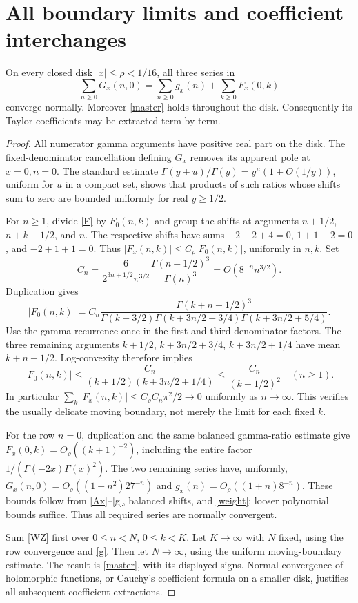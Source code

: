 \documentclass[11pt,a4paper]{article}
\begin{document}
\section{All boundary limits and coefficient interchanges}
\begin{lemma}\label{normal}
On every closed disk $|x|\le\rho<1/16$, all three series in
\begin{equation}\label{master}
 \sum_{n\ge0}G_x(n,0)=\sum_{n\ge0}g_x(n)+\sum_{k\ge0}F_x(0,k)
\end{equation}
converge normally. Moreover \eqref{master} holds throughout the disk.
Consequently its Taylor coefficients may be extracted term by term.
\end{lemma}
\begin{proof}
All numerator gamma arguments have positive real part on the disk.
The fixed-denominator cancellation defining $G_x$ removes its apparent
pole at $x=0,n=0$. The standard estimate
$\Gamma(y+u)/\Gamma(y)=y^u(1+O(1/y))$, uniform for $u$ in a compact set,
shows that products of such ratios whose shifts sum to zero are bounded
uniformly for real $y\ge1/2$.

For $n\ge1$, divide \eqref{F} by $F_0(n,k)$ and group the shifts at
arguments $n+1/2$, $n+k+1/2$, and $n$. The respective shifts have sums
$-2-2+4=0$, $1+1-2=0$, and $-2+1+1=0$.
Thus $|F_x(n,k)|\le C_\rho|F_0(n,k)|$, uniformly in $n,k$.
Set
\[
 C_n=\frac6{2^{3n+1/2}\pi^{3/2}}
       \frac{\Gamma(n+1/2)^3}{\Gamma(n)^3}=O(8^{-n}n^{3/2}).
\]
Duplication gives
\[
 |F_0(n,k)|=C_n
 \frac{\Gamma(k+n+1/2)^3}
 {\Gamma(k+3/2)\Gamma(k+3n/2+3/4)\Gamma(k+3n/2+5/4)}.
\]
Use the gamma recurrence once in the first and third denominator factors.
The three remaining arguments
$k+1/2$, $k+3n/2+3/4$, $k+3n/2+1/4$ have mean $k+n+1/2$.
Log-convexity therefore implies
\[
 |F_0(n,k)|\le\frac{C_n}{(k+1/2)(k+3n/2+1/4)}
 \le\frac{C_n}{(k+1/2)^2}\quad(n\ge1).
\]
In particular $\sum_k|F_x(n,k)|\le C_\rho C_n\pi^2/2\to0$
uniformly as $n\to\infty$. This verifies the usually delicate moving
boundary, not merely the limit for each fixed $k$.

For the row $n=0$, duplication and the same balanced gamma-ratio estimate
give $F_x(0,k)=O_\rho((k+1)^{-2})$, including the entire factor
$1/(\Gamma(-2x)\Gamma(x)^2)$. The two remaining series have, uniformly,
$G_x(n,0)=O_\rho((1+n^2)27^{-n})$ and
$g_x(n)=O_\rho((1+n)8^{-n})$. These bounds follow from \eqref{Ax}--\eqref{g},
balanced shifts, and \eqref{weight}; looser polynomial bounds suffice.
Thus all required series are normally convergent.

Sum \eqref{WZ} first over $0\le n<N$, $0\le k<K$. Let $K\to\infty$
with $N$ fixed, using the row convergence and \eqref{g}. Then let
$N\to\infty$, using the uniform moving-boundary estimate. The result is
\eqref{master}, with its displayed signs. Normal convergence of
holomorphic functions, or Cauchy's coefficient formula on a smaller disk,
justifies all subsequent coefficient extractions.
\end{proof}
\end{document}
